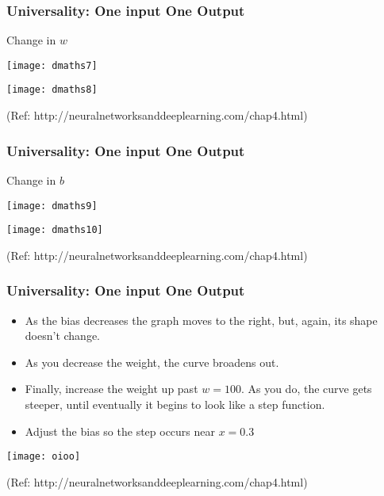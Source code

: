 \begin{frame}[fragile] \frametitle{Universality: One input One Output}
Change in $w$

\begin{center}
\texttt{[image: dmaths7]}
\end{center}

\begin{center}
\texttt{[image: dmaths8]}
\end{center}

{\tiny (Ref: http://neuralnetworksanddeeplearning.com/chap4.html)}
\end{frame}

\begin{frame}[fragile] \frametitle{Universality: One input One Output}
Change in $b$

\begin{center}
\texttt{[image: dmaths9]}
\end{center}

\begin{center}
\texttt{[image: dmaths10]}
\end{center}

{\tiny (Ref: http://neuralnetworksanddeeplearning.com/chap4.html)}
\end{frame}


\begin{frame}[fragile] \frametitle{Universality: One input One Output}
\begin{itemize}
\item As the bias decreases the graph moves to the right, but, again, its shape doesn't change.
\item As you decrease the weight, the curve broadens out. 
\item Finally, increase the weight up past $w=100$. As you do, the curve gets steeper, until eventually it begins to look like a step function. 
\item Adjust the bias so the step occurs near $x=0.3$
\end{itemize}

\begin{center}
\texttt{[image: oioo]}
\end{center}
{\tiny (Ref: http://neuralnetworksanddeeplearning.com/chap4.html)}
\end{frame}




